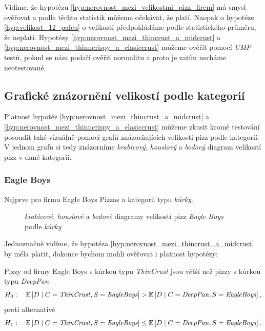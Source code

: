 \documentclass[czech]{article}
\newcommand\E{\ensuremath{\mathbb{E}}}
\begin{document}
Vidíme, že hypotézu \ref{hyp:nerovnost_mezi_velikostmi_pizz_firem} má smysl ověřovat a podle těchto
statistik můžeme očekávat, že platí. Naopak o hypotéze \ref{hyp:velikost_12_palcu} o velikosti
předpokládáme podle statistického průměru, že neplatí. Hypotézy
\ref{hyp:nerovnost_mezi_thincrust_a_midcrust} a \ref{hyp:nerovnost_mezi_thinncrispy_a_clasiccrust}
můžeme ověřit pomocí \emph{UMP} testů, pokud se nám podaří ověřit normalitu a proto je zatím necháme
neotestované.

\subsection{Grafické znázornění velikostí podle kategorií}%
\label{sub:graficke_znazorneni_velikosti_podle_kategorii}
Platnost hypotéz \ref{hyp:nerovnost_mezi_thincrust_a_midcrust} a
\ref{hyp:nerovnost_mezi_thinncrispy_a_clasiccrust} můžeme zkusit kromě testování
posoudit také vizuálně pomocí grafů znázorňujících velikosti pizz podle kategorií.
V jednom grafu si tedy znázorníme \emph{krabicový},
\emph{houslový} a \emph{bodový} diagram velikostí pizz v dané kategorii.

\subsubsection*{Eagle Boys}%
\label{ssub:graficke_znazorneni_eagle_boys}

Nejprve pro firmu
Eagle Boys Pizzas a kategorii typu \emph{kůrky}.

\begin{figure}[H]
	\centering
	\label{fig:eagleboys_crust_diagrams}
	
	\caption{\emph{krabicové}, \emph{houslové} a \emph{bodové} diagramy velikostí pizz \emph{Eagle Boys} podle \emph{kůrky}}
\end{figure}

\noindent Jednoznačně vidíme, že hypotéza \ref{hyp:nerovnost_mezi_thincrust_a_midcrust} by měla
platit, dokonce bychom mohli ověřovat i platnost hypotézy:

\begin{hypothesis}
	\label{hyp:nerovnost_mezi_thincrust_a_deeppan}
	Pizzy od firmy Eagle Boys s kůrkou typu \emph{ThinCrust} jsou větší než pizzy s kůrkou typu \emph{DeepPan}
	\[
		H_0: \quad \E\left[D \mid C = \text{\emph{ThinCrust}}, S = \text{\emph{EagleBoys}} \right] >
		\E\left[ D \mid C = \text{\emph{DeepPan}}, S = \text{\emph{EagleBoys}}\right],
	\]
	proti alternativě
	\[
		H_1: \quad \E\left[D \mid C = \text{\emph{ThinCrust}}, S = \text{\emph{EagleBoys}} \right]
		\le
		\E\left[ D \mid C = \text{\emph{DeepPan}}, S = \text{\emph{EagleBoys}}\right].
	\]
\end{hypothesis}
\end{document}
